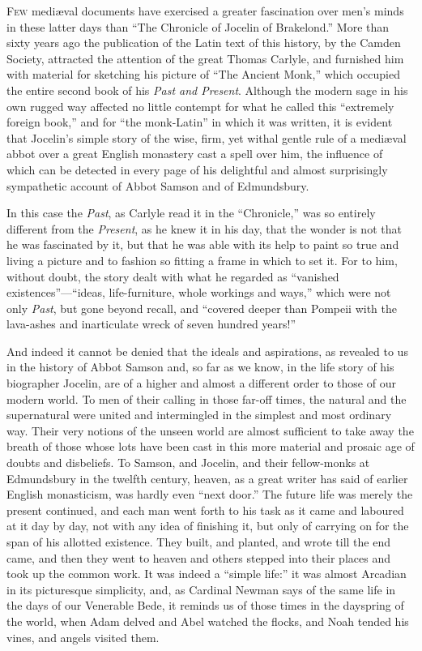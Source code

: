 \documentclass{book}
\begin{document}
{{

\lettrine[lines=4]{\color{BrickRed}F}{ew} medi\ae{}val documents have exercised a greater fascination over men's minds in these latter days than ``The Chronicle of Jocelin of Brakelond.'' More than sixty years ago the publication of the Latin text of this history, by the Camden Society, attracted the attention of the great Thomas Carlyle, and furnished him with material for sketching his picture of ``The Ancient Monk,'' which occupied the entire second book of his \emph{Past and Present}. Although the modern sage in his own rugged way affected no little contempt for what he called this ``extremely foreign book,'' and for ``the monk-Latin'' in which it was written, it is evident that Jocelin's simple story of the wise, firm, yet withal gentle rule of a medi\ae{}val abbot over a great English monastery cast a spell over him, the influence of which can be detected in every page of his delightful and almost surprisingly sympathetic account of Abbot Samson and of Edmundsbury.

In this case the \emph{Past}, as Carlyle read it in the ``Chronicle,'' was so entirely different from the \emph{Present}, as he knew it in his day, that the wonder is not that he was fascinated by it, but that he was able with its help to paint so true and living a picture and to fashion so fitting a frame in which to set it. For to him, without doubt, the story dealt with what he regarded as ``vanished existences''---``ideas, life-furniture, whole workings and ways,'' which were not only \emph{Past}, but gone beyond recall, and ``covered deeper than Pompeii with the lava-ashes and inarticulate wreck of seven hundred years!''

And indeed it cannot be denied that the ideals and aspirations, as revealed to us in the history of Abbot Samson and, so far as we know, in the life story of his biographer Jocelin, are of a higher and almost a different order to those of our modern world. To men of their calling in those far-off times, the natural and the supernatural were united and intermingled in the simplest and most ordinary way. Their very notions of the unseen world are almost sufficient to take away the breath of those whose lots have been cast in this more material and prosaic age of doubts and disbeliefs. To Samson, and Jocelin, and their fellow-monks at Edmundsbury in the twelfth century, heaven, as a great writer has said of earlier English monasticism, was hardly even ``next door.'' The future life was merely the present continued, and each man went forth to his task as it came and laboured at it day by day, not with any idea of finishing it, but only of carrying on for the span of his allotted existence. They built, and planted, and wrote till the end came, and then they went to heaven and others stepped into their places and took up the common work. It was indeed a ``simple life:'' it was almost Arcadian in its picturesque simplicity, and, as Cardinal Newman says of the same life in the days of our Venerable Bede, it reminds us of those times in the dayspring of the world, when Adam delved and Abel watched the flocks, and Noah tended his vines, and angels visited them.

}}
\end{document}
